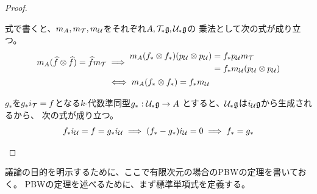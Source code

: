 {\begin{proof}
\begin{description}
		式で書くと、$m_A,m_{{\mathcal{T}}},m_{{\mathcal{U}}}$をそれぞれ$A,{{\mathcal{T}}}_*{\mathfrak{g}},{{\mathcal{U}}}_*{\mathfrak{g}}$の
		乗法として次の式が成り立つ。
		\begin{equation*}\begin{split}
			m_A(\widehat{f}\otimes\widehat{f}) = \widehat{f}m_{{\mathcal{T}}}
			&\implies \begin{split}
				m_A(f_*\otimes f_*)(p_{{\mathcal{U}}}\otimes p_{{\mathcal{U}}}) &= f_*p_{{\mathcal{U}}} m_{{\mathcal{T}}} \\
				&= f_*m_{{\mathcal{U}}}(p_{{\mathcal{U}}}\otimes p_{{\mathcal{U}}}) \\
			\end{split} \\
			&\iff m_A(f_*\otimes f_*) = f_*m_{{\mathcal{U}}}
		\end{split}\end{equation*}
		\item[一意] $g_*$を$g_*i_{{\mathcal{T}}}=f$となる$k$-代数準同型$g_*:{{\mathcal{U}}}_*{\mathfrak{g}}\to A$
		とすると、${{\mathcal{U}}}_*{\mathfrak{g}}$は$i_{{\mathcal{U}}}{\mathfrak{g}}$から生成されるから、
		次の式が成り立つ。
		\begin{equation*}\begin{split}
			f_*i_{{\mathcal{U}}} = f = g_*i_{{\mathcal{U}}} \implies (f_*-g_*)i_{{\mathcal{U}}} = 0
			\implies f_* = g_*
		\end{split}\end{equation*}
	\end{description} %
	\end{proof}

	議論の目的を明示するために、ここで有限次元の場合のPBWの定理を書いておく。
	PBWの定理を述べるために、まず標準単項式を定義する。
	
}
